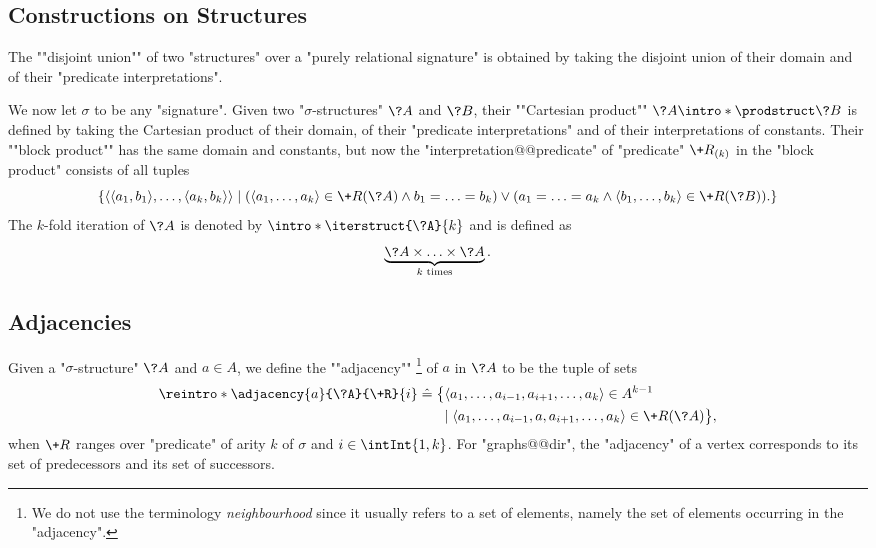 \subsection{Constructions on Structures}

The \AP""disjoint union"" of two "structures" over a
"purely relational signature" 
is obtained by taking the disjoint union of their domain and of
their "predicate interpretations".

We now let $\sigma$ to be any "signature".
Given two "$\sigma$-structures" $\?A$ and $\?B$, their
""Cartesian product"" \AP$\?A \intro*\prodstruct \?B$
is defined by taking the Cartesian product of their domain, of
their "predicate interpretations" and of their interpretations of constants. 
Their ""block product"" has the same domain and constants,
but now the "interpretation@@predicate" of "predicate" $\+R_{(k)}$
in the "block product" consists of all tuples
\[
	\set{
		\tup{\tup{a_1,b_1}, \dotsc, \tup{a_k,b_k}}
		\mid
		(\tup{a_1, \dotsc, a_k} \in \+R(\?A)
		\land b_1 = \dotsc = b_k )
		\lor
		(a_1 = \dotsc = a_k
		\land \tup{b_1, \dotsc, b_k} \in \+R(\?B) ).
	}
\]
The $k$-fold iteration of $\?A$ is denoted by
$\intro*\iterstruct{\?A}{k}$ and is defined as
\[
\underbrace{\?A \times \dotsc \times \?A}_{k \text{ times}}.
\]

\subsection{Adjacencies}

Given a "$\sigma$-structure" $\?A$ and $a \in A$, we define the \AP""adjacency""%
\footnote{We do not use the terminology \emph{neighbourhood} since it usually refers
to a set of elements, namely the set of elements occurring in the "adjacency".}
of $a$ in $\?A$ to be the tuple of sets%
\AP{}
\begin{align*}
	\reintro*\adjacency{a}{\?A}{\+R}{i} & \defeq
		\big\{
			\langle a_1, \dotsc, a_{i-1}, a_{i+1}, \dotsc, a_k \rangle \in A^{k-1}
			\\ & \hphantom{\defeq \big\{ }\mid
			\langle a_1, \dotsc, a_{i-1}, a, a_{i+1}, \dotsc, a_k \rangle \in \+R(\?A)
		\big\},
\end{align*}
when $\+R$ ranges over "predicate" of arity $k$ of $\sigma$ and $i \in \intInt{1,k}$. 
For "graphs@@dir", the "adjacency" of a vertex corresponds to its set of predecessors and
its set of successors.

